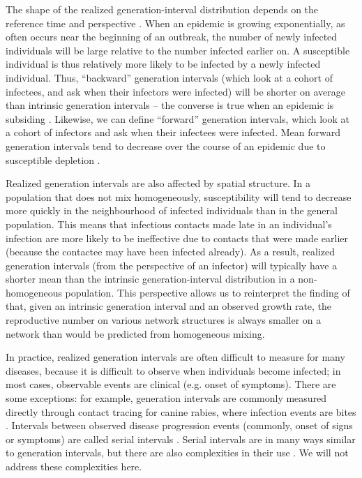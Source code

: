 \documentclass[12pt]{article}
\begin{document}
The shape of the realized generation-interval distribution depends on the reference time and perspective \citep{kenah2008generation, nishiura2010time, tomba2010some, champredon2015intrinsic, britton2019estimation}.
When an epidemic is growing exponentially, as often occurs near the beginning of an outbreak, the number of newly infected individuals will be large relative to the number infected earlier on. 
A susceptible individual is thus relatively more likely to be infected by a newly infected individual. 
Thus, ``backward'' generation intervals (which look at a cohort of infectees, and ask when their infectors were infected) will be shorter on average than intrinsic generation intervals -- the converse is true when an epidemic is subsiding \citep{nishiura2010time, champredon2015intrinsic, britton2019estimation}.
Likewise, we can define ``forward'' generation intervals, which look at a cohort of infectors and ask when their infectees were infected.
Mean forward generation intervals tend to decrease over the course of an epidemic due to susceptible depletion \citep{kenah2008generation, nishiura2010time, tomba2010some, champredon2015intrinsic}.

Realized generation intervals are also affected by spatial structure.
In a population that does not mix homogeneously, susceptibility will tend to decrease more quickly in the neighbourhood of infected individuals than in the general population.
This means that infectious contacts made late in an individual's infection are more likely to be ineffective due to contacts that were made earlier (because the contactee may have been infected already).
As a result, realized generation intervals (from the perspective of an infector) will typically have a shorter mean than the intrinsic generation-interval distribution in a non-homogeneous population.
This perspective allows us to reinterpret the finding of \cite{trapman2016inferring} that, given an intrinsic generation interval and an observed growth rate, the reproductive number on various network structures is always smaller on a network than would be predicted from homogeneous mixing.

In practice, realized generation intervals are often difficult to measure for many diseases, because it is difficult to observe when individuals become infected;
in most cases, observable events are clinical (e.g. onset of symptoms).
There are some exceptions: for example, generation intervals are commonly measured directly through contact tracing for canine rabies, where infection events are bites \citep{hampson2009transmission}.
Intervals between observed disease progression events (commonly, onset of signs or symptoms) are called serial intervals \citep{svensson2007note}.
Serial intervals are in many ways similar to generation intervals, but there are also complexities in their use  \citep{britton2019estimation}.
We will not address these complexities here.
\end{document}
